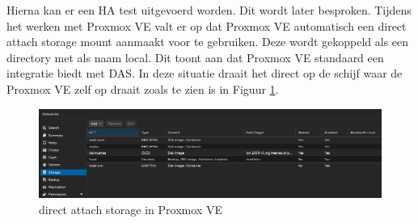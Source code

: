 Hierna kan er een HA test uitgevoerd worden. Dit wordt later besproken.
Tijdens het werken met Proxmox VE valt er op dat Proxmox VE automatisch een direct attach storage mount aanmaakt voor te gebruiken. Deze wordt gekoppeld als een directory met als naam local.
Dit toont aan dat Proxmox VE standaard een integratie biedt met DAS. In deze situatie draait het direct op de schijf waar de Proxmox VE zelf op draait zoals te zien is in Figuur \ref{fig:das-prox}.
\begin{figure}[H]
  \centering
  \includegraphics[width=1.1\textwidth]{../poc/das-proxmox.png}
  \caption{direct attach storage in Proxmox VE}
  \label{fig:das-prox}
\end{figure}


